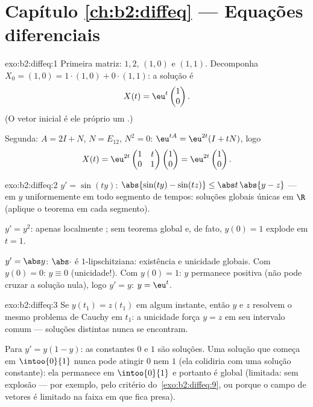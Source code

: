 \section*{Capítulo \ref{ch:b2:diffeq} --- Equações diferenciais}

\begin{solution}{exo:b2:diffeq:1}
Primeira matriz:  $1, 2$,  $(1,0)$ e $(1,1)$.
Decomponha $X_0 = (1,0) = 1\cdot(1,0) + 0\cdot(1,1)$: a solução
é
\[
X(t) = \eu^{t}\begin{pmatrix}1\\ 0\end{pmatrix} .
\]
(O vetor inicial é ele próprio um .)

Segunda: $A = 2I + N$, $N = E_{12}$, $N^2 = 0$: $\eu^{tA} =
\eu^{2t}(I + tN)$, logo
\[
X(t) = \eu^{2t}\begin{pmatrix} 1 & t\\ 0 & 1\end{pmatrix}
\begin{pmatrix}1\\ 0\end{pmatrix}
= \eu^{2t}\begin{pmatrix}1\\ 0\end{pmatrix}.
\]
\end{solution}

\begin{solution}{exo:b2:diffeq:2}
$y' = \sin(ty)$: $\abs{\sin(ty) - \sin(tz)} \leq \abs t\,\abs{y -
z}$ ---  em $y$ uniformemente em todo segmento de tempos:
soluções globais únicas em $\R$ (aplique o teorema em cada
segmento).

$y' = y^2$: apenas localmente ; sem teorema global e, de fato,
$y(0) = 1$ explode em $t = 1$.

$y' = \abs y$: $\abs\cdot$ é $1$-lipschitziana: existência e unicidade
globais. Com $y(0) = 0$: $y \equiv 0$ (unicidade!). Com $y(0)
= 1$: $y$ permanece positiva (não pode cruzar a solução nula), logo $y' =
y$: $y = \eu^t$.
\end{solution}

\begin{solution}{exo:b2:diffeq:3}
Se $y(t_1) = z(t_1)$ em algum instante, então $y$ e $z$ resolvem o mesmo
problema de Cauchy em $t_1$: a unicidade força $y = z$ em seu intervalo
comum --- soluções distintas nunca se encontram.

Para $y' = y(1-y)$: as constantes $0$ e $1$ são soluções. Uma
solução que começa em $\intoo{0}{1}$ nunca pode atingir $0$ nem $1$
(ela colidiria com uma solução constante): ela permanece em
$\intoo{0}{1}$ e portanto é global (limitada: sem explosão --- por
exemplo, pelo critério do~\cref{exo:b2:diffeq:9}, ou porque o campo de vetores
é limitado na faixa em que fica presa).
\end{solution}

